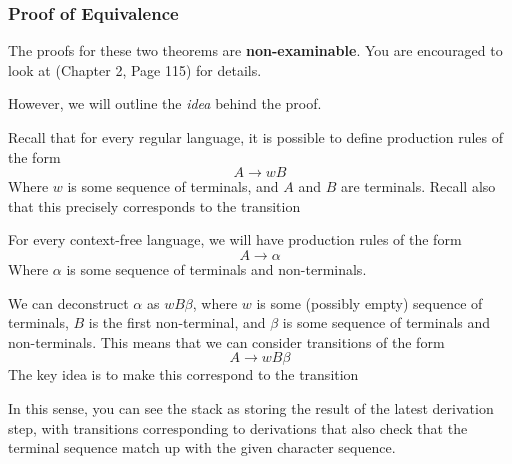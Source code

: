 \subsubsection{Proof of Equivalence\optional}
The proofs for these two theorems are \textbf{\textsf{non-examinable}}. You are encouraged to look at \citet{sipser-2006} (Chapter 2, Page 115) for details.

However, we will outline the \textit{idea} behind the proof. 

Recall that for every regular language, it is possible to define production rules of the form
\[A \rightarrow wB\]
Where $w$ is some sequence of terminals, and $A$ and $B$ are terminals. Recall also that this precisely corresponds to the transition
\begin{center}
\end{center}

For every context-free language, we will have production rules of the form
\[A \rightarrow \alpha\]
Where $\alpha$ is some sequence of terminals and non-terminals.

We can deconstruct $\alpha$ as $wB\beta$, where $w$ is some (possibly empty) sequence of terminals, $B$ is the first non-terminal, and $\beta$ is some sequence of terminals and non-terminals. This means that we can consider transitions of the form 
\[A \rightarrow wB\beta \]
The key idea is to make this correspond to the transition
\begin{center}
\end{center}

In this sense, you can see the stack as storing the result of the latest derivation step, with transitions corresponding to derivations that also check that the terminal sequence match up with the given character sequence.

